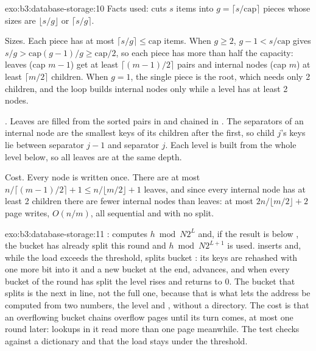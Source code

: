 \begin{solution}{exo:b3:database-storage:10}
Facts used:  cuts $s$ items into $g = \lceil s/\text{cap} \rceil$ pieces whose sizes are $\lfloor s/g \rfloor$ or $\lceil s/g \rceil$.

Sizes. Each piece has at most $\lceil s/g \rceil \le \text{cap}$ items. When $g \ge 2$, $g - 1 < s/\text{cap}$ gives $s/g > \text{cap}(g-1)/g \ge \text{cap}/2$, so each piece has more than half the capacity: leaves (cap $m - 1$) get at least $\lceil (m-1)/2 \rceil$ pairs and internal nodes (cap $m$) at least $\lceil m/2 \rceil$ children. When $g = 1$, the single piece is the root, which needs only 2 children, and the loop builds internal nodes only while a level has at least 2 nodes.

. Leaves are filled from the sorted pairs in  and chained in . The separators of an internal node are the smallest keys of its children after the first, so child $j$'s keys lie between separator $j - 1$ and separator $j$. Each level is built from the whole level below, so all leaves are at the same depth.

Cost. Every node is written once. There are at most $n/\lceil (m-1)/2 \rceil + 1 \le n/\lfloor m/2 \rfloor + 1$ leaves, and since every internal node has at least 2 children there are fewer internal nodes than leaves: at most $2n/\lfloor m/2 \rfloor + 2$ page writes, $O(n/m)$, all sequential and with no split.
\end{solution}

\begin{solution}{exo:b3:database-storage:11}
:  computes $h \bmod N 2^L$ and, if the result is below , the bucket has already split this round and $h \bmod N 2^{L+1}$ is used.  inserts and, while the load exceeds the threshold, splits bucket : its keys are rehashed with one more bit into it and a new bucket at the end,  advances, and when every bucket of the round has split the level rises and  returns to 0. The bucket that splits is the next in line, not the full one, because that is what lets the address be computed from two numbers, the level and , without a directory. The cost is that an overflowing bucket chains overflow pages until its turn comes, at most one round later: lookups in it read more than one page meanwhile. The test checks  against a dictionary and that the load stays under the threshold.
\end{solution}

